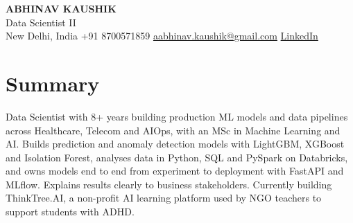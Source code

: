\documentclass[10pt,a4paper]{article}
\begin{document}
\begin{center}
  {\LARGE\bfseries ABHINAV KAUSHIK}\\[2pt]
  {\large Data Scientist II}\\[2pt]
  New Delhi, India \textbar{} +91 8700571859 \textbar{} \href{mailto:aabhinav.kaushik@gmail.com}{aabhinav.kaushik@gmail.com} \textbar{} \href{https://www.linkedin.com/in/abhinav-kaushik10/}{LinkedIn}  
\end{center}

\section{Summary}
Data Scientist with 8+ years building production ML models and data pipelines across Healthcare, Telecom and AIOps, with an MSc in Machine Learning and AI. Builds prediction and anomaly detection models with LightGBM, XGBoost and Isolation Forest, analyses data in Python, SQL and PySpark on Databricks, and owns models end to end from experiment to deployment with FastAPI and MLflow. Explains results clearly to business stakeholders. Currently building ThinkTree.AI, a non-profit AI learning platform used by NGO teachers to support students with ADHD.
\end{document}

